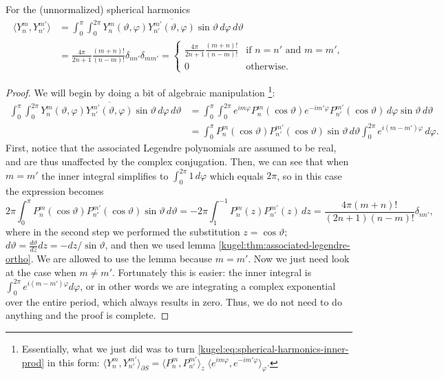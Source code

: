 \begin{theorem} For the (unnormalized) spherical harmonics
  \label{kugel:thm:spherical-harmonics-ortho}
  \begin{align}
    \langle Y^m_n, Y^{m'}_{n'} \rangle
    &= \int_{0}^\pi \int_0^{2\pi}
      Y^m_n(\vartheta, \varphi) \overline{Y^{m'}_{n'}(\vartheta, \varphi)}
      \sin \vartheta \, d\varphi \, d\vartheta
      \label{kugel:eq:spherical-harmonics-inner-prod} \\
    &= \frac{4\pi}{2n + 1} \frac{(m + n)!}{(n - m)!} \delta_{nn'} \delta_{mm'}
    = \begin{cases}
      \frac{4\pi}{2n + 1} \frac{(m + n)!}{(n - m)!}
        & \text{if } n = n' \text{ and } m = m', \nonumber \\
      0 & \text{otherwise}.
    \end{cases}
  \end{align}
\end{theorem}
\begin{proof}
  We will begin by doing a bit of algebraic manipulation \footnote{
    Essentially, what we just did was to turn
    \eqref{kugel:eq:spherical-harmonics-inner-prod} in this form:
    \(
      \langle Y^m_n, Y^{m'}_{n'} \rangle_{\partial S}
      = \langle P^m_n, P^{m'}_{n'} \rangle_z
      \; \langle e^{im\varphi}, e^{-im'\varphi} \rangle_\varphi
    \).
  }:
  \begin{align*}
    \int_{0}^\pi \int_0^{2\pi}
      Y^m_n(\vartheta, \varphi) \overline{Y^{m'}_{n'}(\vartheta, \varphi)} 
      \sin \vartheta \, d\varphi \, d\vartheta
    &= \int_{0}^\pi \int_0^{2\pi}
      e^{im\varphi} P^m_n(\cos \vartheta)
      e^{-im'\varphi} P^{m'}_{n'}(\cos \vartheta)
      \, d\varphi \sin \vartheta \, d\vartheta 
    \\
    &= \int_{0}^\pi
      P^m_n(\cos \vartheta) P^{m'}_{n'}(\cos \vartheta) \sin \vartheta \, d\vartheta
      \int_0^{2\pi} e^{i(m - m')\varphi}
      \, d\varphi. 
  \end{align*}
  First, notice that the associated Legendre polynomials are assumed to be real,
  and are thus unaffected by the complex conjugation. Then, we can see that when
  $m = m'$ the inner integral simplifies to $\int_0^{2\pi} 1 \, d\varphi$ which
  equals $2\pi$, so in this case the expression becomes
  \begin{equation*}
    2\pi \int_{0}^\pi
      P^m_n(\cos \vartheta) P^{m'}_{n'}(\cos \vartheta)
    \sin \vartheta \, d\vartheta
    = -2\pi \int_{1}^{-1} P^m_n(z) P^{m'}_{n'}(z) \, dz
    = \frac{4\pi(m + n)!}{(2n + 1)(n - m)!} \delta_{nn'},
  \end{equation*}
  where in the second step we performed the substitution $z = \cos\vartheta$;
  $d\vartheta = \frac{d\vartheta}{dz} dz= - dz / \sin \vartheta$, and then we
  used lemma \ref{kugel:thm:associated-legendre-ortho}.  We are allowed to use
  the lemma because $m = m'$. Now we just need look at the case when $m \neq
  m'$. Fortunately this is easier: the inner integral is $\int_0^{2\pi} e^{i(m -
  m')\varphi} d\varphi$, or in other words we are integrating a complex
  exponential over the entire period, which always results in zero. Thus, we do
  not need to do anything and the proof is complete.
\end{proof}

